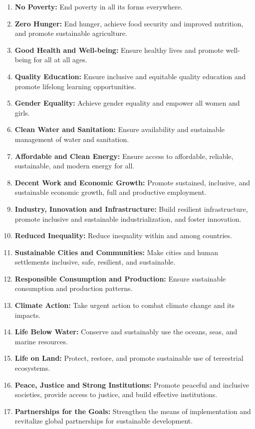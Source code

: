\begin{enumerate}[label=\textbf{SDG\arabic*:}, labelwidth=1.6cm, labelsep=0.2cm, leftmargin=*, align=left, noitemsep]
    \item \textbf{No Poverty:} End poverty in all its forms everywhere.
    \item \textbf{Zero Hunger:} End hunger, achieve food security and improved nutrition, and promote sustainable agriculture.
    \item \textbf{Good Health and Well-being:} Ensure healthy lives and promote well-being for all at all ages.
    \item \textbf{Quality Education:} Ensure inclusive and equitable quality education and promote lifelong learning opportunities.
    \item \textbf{Gender Equality:} Achieve gender equality and empower all women and girls.
    \item \textbf{Clean Water and Sanitation:} Ensure availability and sustainable management of water and sanitation.
    \item \textbf{Affordable and Clean Energy:} Ensure access to affordable, reliable, sustainable, and modern energy for all.
    \item \textbf{Decent Work and Economic Growth:} Promote sustained, inclusive, and sustainable economic growth, full and productive employment.
    \item \textbf{Industry, Innovation and Infrastructure:} Build resilient infrastructure, promote inclusive and sustainable industrialization, and foster innovation.
    \item \textbf{Reduced Inequality:} Reduce inequality within and among countries.
    \item \textbf{Sustainable Cities and Communities:} Make cities and human settlements inclusive, safe, resilient, and sustainable.
    \item \textbf{Responsible Consumption and Production:} Ensure sustainable consumption and production patterns.
    \item \textbf{Climate Action:} Take urgent action to combat climate change and its impacts.
    \item \textbf{Life Below Water:} Conserve and sustainably use the oceans, seas, and marine resources.
    \item \textbf{Life on Land:} Protect, restore, and promote sustainable use of terrestrial ecosystems.
    \item \textbf{Peace, Justice and Strong Institutions:} Promote peaceful and inclusive societies, provide access to justice, and build effective institutions.
    \item \textbf{Partnerships for the Goals:} Strengthen the means of implementation and revitalize global partnerships for sustainable development.
\end{enumerate}

\newpage
